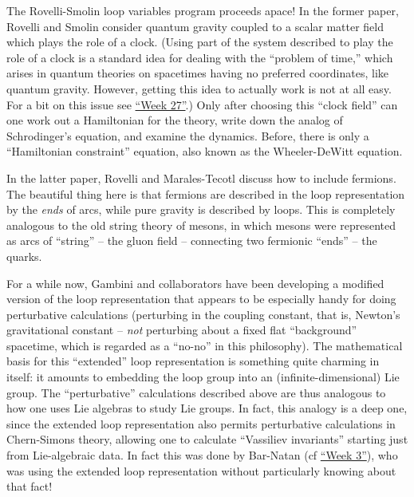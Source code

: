\documentclass{article}
\def\tightlist{}
\renewcommand{\texttt}[1]{%
  \begingroup
  \ttfamily
  \begingroup\lccode`~=`/\lowercase{\endgroup\def~}{/\discretionary{}{}{}}%
  \begingroup\lccode`~=`[\lowercase{\endgroup\def~}{[\discretionary{}{}{}}%
  \begingroup\lccode`~=`.\lowercase{\endgroup\def~}{.\discretionary{}{}{}}%
  \catcode`/=\active\catcode`[=\active\catcode`.=\active
  \scantokens{#1\noexpand}%
  \endgroup
}
\begin{document}
The Rovelli-Smolin loop variables program proceeds apace! In the former
paper, Rovelli and Smolin consider quantum gravity coupled to a scalar
matter field which plays the role of a clock. (Using part of the system
described to play the role of a clock is a standard idea for dealing
with the ``problem of time,'' which arises in quantum theories on
spacetimes having no preferred coordinates, like quantum gravity.
However, getting this idea to actually work is not at all easy. For a
bit on this issue see \protect\hyperlink{week27}{``Week 27''}.) Only
after choosing this ``clock field'' can one work out a Hamiltonian for
the theory, write down the analog of Schrodinger's equation, and examine
the dynamics. Before, there is only a ``Hamiltonian constraint''
equation, also known as the Wheeler-DeWitt equation.

In the latter paper, Rovelli and Marales-Tecotl discuss how to include
fermions. The beautiful thing here is that fermions are described in the
loop representation by the \emph{ends} of arcs, while pure gravity is
described by loops. This is completely analogous to the old string
theory of mesons, in which mesons were represented as arcs of ``string''
-- the gluon field -- connecting two fermionic ``ends'' -- the quarks.


For a while now, Gambini and collaborators have been developing a
modified version of the loop representation that appears to be
especially handy for doing perturbative calculations (perturbing in the
coupling constant, that is, Newton's gravitational constant --
\emph{not} perturbing about a fixed flat ``background'' spacetime, which
is regarded as a ``no-no'' in this philosophy). The mathematical basis
for this ``extended'' loop representation is something quite charming in
itself: it amounts to embedding the loop group into an
(infinite-dimensional) Lie group. The ``perturbative'' calculations
described above are thus analogous to how one uses Lie algebras to study
Lie groups. In fact, this analogy is a deep one, since the extended loop
representation also permits perturbative calculations in Chern-Simons
theory, allowing one to calculate ``Vassiliev invariants'' starting just
from Lie-algebraic data. In fact this was done by Bar-Natan (cf
\protect\hyperlink{week3}{``Week 3''}), who was using the extended loop
representation without particularly knowing about that fact!
\end{document}
